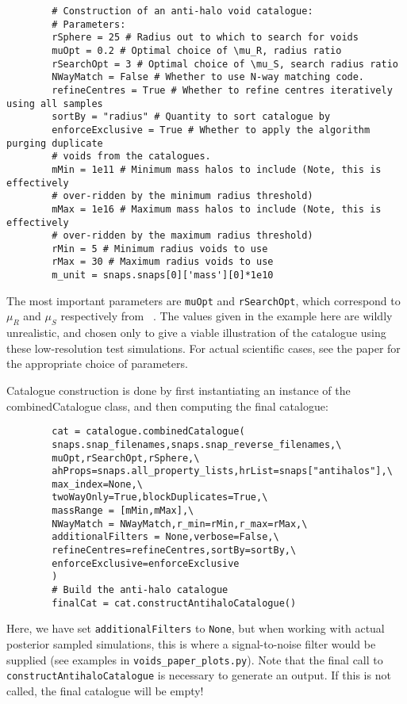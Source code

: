 \documentclass{article}
\newcommand{\codefont}[1]{{\texttt{#1}}}
\begin{document}
	\begin{verbatim}
		# Construction of an anti-halo void catalogue:
		# Parameters:
		rSphere = 25 # Radius out to which to search for voids
		muOpt = 0.2 # Optimal choice of \mu_R, radius ratio
		rSearchOpt = 3 # Optimal choice of \mu_S, search radius ratio
		NWayMatch = False # Whether to use N-way matching code.
		refineCentres = True # Whether to refine centres iteratively using all samples
		sortBy = "radius" # Quantity to sort catalogue by
		enforceExclusive = True # Whether to apply the algorithm purging duplicate
		# voids from the catalogues.
		mMin = 1e11 # Minimum mass halos to include (Note, this is effectively
		# over-ridden by the minimum radius threshold)
		mMax = 1e16 # Maximum mass halos to include (Note, this is effectively 
		# over-ridden by the maximum radius threshold)
		rMin = 5 # Minimum radius voids to use
		rMax = 30 # Maximum radius voids to use
		m_unit = snaps.snaps[0]['mass'][0]*1e10
	\end{verbatim}
	The most important parameters are \codefont{muOpt} and \codefont{rSearchOpt}, which correspond to $\mu_R$ and $\mu_S$ respectively from ~\citet{10.1093/mnras/stae1251}. The values given in the example here are wildly unrealistic, and chosen only to give a viable illustration of the catalogue using these low-resolution test simulations. For actual scientific cases, see the paper for the appropriate choice of parameters.
	
	Catalogue construction is done by first instantiating an instance of the combinedCatalogue class, and then computing the final catalogue:
	
	\begin{verbatim}
		cat = catalogue.combinedCatalogue(
		snaps.snap_filenames,snaps.snap_reverse_filenames,\
		muOpt,rSearchOpt,rSphere,\
		ahProps=snaps.all_property_lists,hrList=snaps["antihalos"],\
		max_index=None,\
		twoWayOnly=True,blockDuplicates=True,\
		massRange = [mMin,mMax],\
		NWayMatch = NWayMatch,r_min=rMin,r_max=rMax,\
		additionalFilters = None,verbose=False,\
		refineCentres=refineCentres,sortBy=sortBy,\
		enforceExclusive=enforceExclusive
		)
		# Build the anti-halo catalogue
		finalCat = cat.constructAntihaloCatalogue()
	\end{verbatim}
	Here, we have set \codefont{additionalFilters} to \codefont{None}, but when working with actual posterior sampled simulations, this is where a signal-to-noise filter would be supplied (see examples in \codefont{voids\_paper\_plots.py}). Note that the final call to \codefont{constructAntihaloCatalogue} is necessary to generate an output. If this is not called, the final catalogue will be empty!
	
\end{document}
